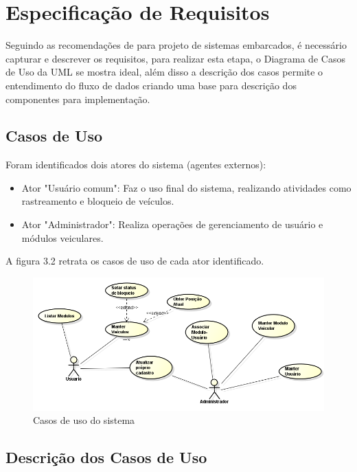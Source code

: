 \section{Especificação de Requisitos}
Seguindo as recomendações de \textcite{Wolf:2001} para projeto de sistemas embarcados, é necessário
capturar e descrever os requisitos, para realizar esta etapa, o Diagrama de Casos de Uso da UML se
mostra ideal, além disso a descrição dos casos permite o entendimento do fluxo de dados criando uma base
para descrição dos componentes para implementação.

\subsection{Casos de Uso}

Foram identificados dois atores do sistema (agentes externos): 

\begin{itemize}
	\item Ator "Usuário comum": Faz o uso final do sistema, realizando atividades como rastreamento e bloqueio
	de veículos.
	\item Ator "Administrador": Realiza operações de gerenciamento de usuário e módulos veiculares.
\end{itemize}
  
A figura 3.2 retrata os casos de uso de cada ator identificado.


\begin{figure}[!htb]
\centering
\includegraphics[width=\textwidth]{figures/2_uc.png}
\caption{Casos de uso do sistema}
\label{1}
\end{figure}

\subsection{Descrição dos Casos de Uso}

